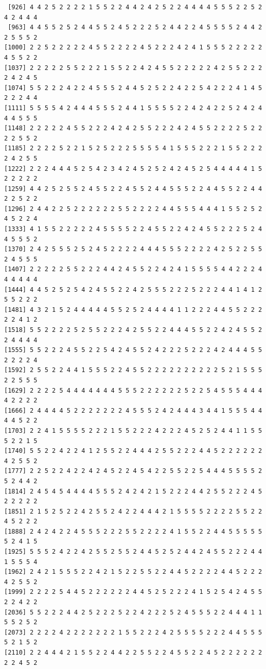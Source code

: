 \documentclass[
  letterpaper,
  DIV=11,
  numbers=noendperiod]{scrreprt}
\begin{document}
\begin{verbatim}
 [926] 4 4 2 5 2 2 2 2 1 5 5 2 2 4 4 2 4 2 5 2 2 4 4 4 4 5 5 5 2 2 5 2 4 2 4 4 4
 [963] 4 4 5 5 2 5 2 4 4 5 5 2 4 5 2 2 2 5 2 4 4 2 2 4 5 5 5 5 2 4 4 2 2 5 5 5 2
[1000] 2 2 5 2 2 2 2 2 4 5 5 2 2 2 2 4 5 2 2 2 4 2 4 1 5 5 5 2 2 2 2 2 4 5 5 2 2
[1037] 2 2 2 2 2 5 5 2 2 2 1 5 5 2 2 4 2 4 5 5 2 2 2 2 2 4 2 5 5 2 2 2 2 4 2 4 5
[1074] 5 5 2 2 2 4 2 2 4 5 5 5 2 4 4 5 2 5 2 2 4 2 2 5 4 2 2 2 4 1 4 5 2 2 2 4 4
[1111] 5 5 5 5 4 2 4 4 4 5 5 5 2 4 4 1 5 5 5 5 2 2 4 2 4 2 2 5 2 4 2 4 4 4 5 5 5
[1148] 2 2 2 2 2 4 5 5 2 2 2 4 2 4 2 5 5 2 2 2 4 2 4 5 5 2 2 2 2 5 2 2 2 2 5 5 2
[1185] 2 2 2 2 5 2 2 1 5 2 5 2 2 2 5 5 5 5 4 1 5 5 5 2 2 2 1 5 5 2 2 2 2 4 2 5 5
[1222] 2 2 2 4 4 4 5 2 5 4 2 3 4 2 4 5 2 5 2 4 2 4 5 2 5 4 4 4 4 4 1 5 2 2 2 2 2
[1259] 4 4 2 5 2 5 5 2 4 5 5 2 2 4 5 5 2 4 4 5 5 5 2 2 4 4 5 5 2 2 4 4 2 2 5 2 2
[1296] 2 4 4 2 2 5 2 2 2 2 2 2 5 5 2 2 2 2 4 4 5 5 5 4 4 4 1 5 5 2 5 2 4 5 2 2 4
[1333] 4 1 5 5 2 2 2 2 2 4 5 5 5 5 2 2 4 5 5 2 2 4 2 4 5 5 2 2 2 5 2 4 4 5 5 5 2
[1370] 2 4 2 5 5 5 2 5 2 4 5 2 2 2 2 4 4 4 5 5 5 2 2 2 2 4 2 5 2 2 5 5 2 4 5 5 5
[1407] 2 2 2 2 2 5 5 2 2 2 4 4 2 4 5 5 2 2 4 2 4 1 5 5 5 5 4 4 2 2 2 4 4 4 4 4 4
[1444] 4 4 5 2 5 2 5 4 2 4 5 5 2 2 4 2 5 5 5 2 2 2 5 2 2 2 4 4 1 4 1 2 5 5 2 2 2
[1481] 4 3 2 1 5 2 4 4 4 4 4 5 5 2 5 2 4 4 4 4 1 1 2 2 2 4 4 5 5 2 2 2 2 2 4 1 2
[1518] 5 5 2 2 2 2 5 2 5 5 2 2 2 4 2 5 5 2 2 4 4 4 5 5 2 2 4 2 4 5 5 2 2 4 4 4 4
[1555] 5 5 2 2 2 4 5 5 2 2 5 4 2 4 5 5 2 4 2 2 2 5 2 2 2 4 2 4 4 4 5 5 2 2 2 2 4
[1592] 2 5 5 2 2 4 4 1 5 5 5 2 2 4 5 5 2 2 2 2 2 2 2 2 2 2 5 2 1 5 5 5 2 2 5 5 5
[1629] 2 2 2 2 5 4 4 4 4 4 4 4 5 5 5 2 2 2 2 2 2 5 2 2 5 4 5 5 5 4 4 4 4 2 2 2 2
[1666] 2 4 4 4 4 5 2 2 2 2 2 2 2 4 5 5 5 2 4 2 4 4 4 3 4 4 1 5 5 5 4 4 4 4 5 2 2
[1703] 2 2 4 1 5 5 5 5 2 2 2 1 5 5 2 2 2 4 2 2 2 4 5 2 5 2 4 4 1 1 5 5 5 2 2 1 5
[1740] 5 5 2 2 4 2 2 4 1 2 5 5 2 2 4 4 4 2 5 5 2 2 2 4 4 5 2 2 2 2 2 2 4 2 5 5 2
[1777] 2 2 5 2 2 4 2 2 4 2 4 5 2 2 4 5 4 2 2 5 5 2 2 5 4 4 4 5 5 5 5 2 5 2 4 4 2
[1814] 2 4 5 4 5 4 4 4 4 5 5 5 2 4 2 4 2 1 5 2 2 2 4 4 2 5 5 2 2 2 4 5 2 2 2 2 2
[1851] 2 1 5 2 5 2 2 4 2 5 5 2 4 2 2 4 4 4 2 1 5 5 5 5 2 2 2 2 5 5 2 2 4 5 2 2 2
[1888] 2 4 2 4 2 2 4 5 5 5 2 2 2 5 5 2 2 2 2 4 1 5 5 2 2 4 4 5 5 5 5 5 5 2 4 1 5
[1925] 5 5 5 2 4 2 2 4 2 5 5 2 5 5 2 4 4 5 2 5 2 4 4 2 4 5 5 2 2 2 4 4 1 5 5 5 4
[1962] 2 4 2 1 5 5 5 2 2 4 2 1 5 2 2 5 5 2 2 4 4 5 2 2 2 2 4 4 5 2 2 2 4 2 5 5 2
[1999] 2 2 2 2 5 4 4 5 2 2 2 2 2 2 4 4 5 2 5 2 2 2 4 1 5 2 5 4 2 4 5 5 2 2 4 2 2
[2036] 5 5 2 2 2 4 4 2 5 2 2 2 5 2 2 4 2 2 2 5 2 4 5 5 5 2 2 4 4 4 1 1 5 5 2 5 2
[2073] 2 2 2 2 4 2 2 2 2 2 2 2 1 5 5 2 2 2 4 2 5 5 5 5 2 2 2 4 4 5 5 5 5 2 1 5 2
[2110] 2 2 4 4 4 2 1 5 5 2 2 4 4 2 2 5 5 2 2 4 5 5 2 2 4 5 2 2 2 2 2 2 2 2 4 5 2

\end{verbatim}
\end{document}

